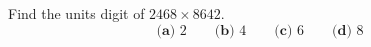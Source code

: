Find the units digit of $2468\times8642$.
\[
\textbf{(a) } 2\qquad\textbf{(b) } 4\qquad\textbf{(c) } 6\qquad\textbf{(d) } 8
\]

